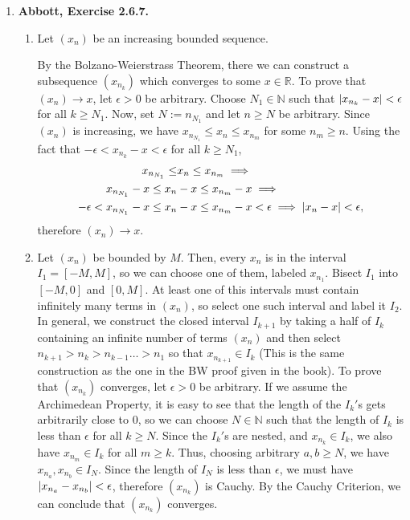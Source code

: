 \documentclass{article}
\DeclarePairedDelimiter\abs{\lvert}{\rvert}
\newcommand{\N}{\mathbb{N}}
\newcommand{\R}{\mathbb{R}}
\newcommand{\ra}{\rightarrow}
\newcommand{\exc}[2][Abbott]{\item \textbf{#1, Exercise #2.}}
\newcommand{\lep}[1][L]{#1et $\epsilon > 0$ be arbitrary}
\begin{document}
\begin{enumerate}
\begin{enumerate}
        \item 
    \end{enumerate}
    
    \exc{2.6.7}
    \begin{enumerate}
        \item Let $(x_n)$ be an increasing bounded sequence. 
        
        By the Bolzano-Weierstrass Theorem, there we can construct a subsequence $(x_{n_k})$ which converges to some $x \in \R$. To prove that $(x_n) \ra x$, \lep[l]. Choose $N_1 \in \N$ such that $\abs{x_{n_k}-x} < \epsilon$ for all $k \geq N_1$. Now, set $N := n_{N_1}$ and let $n \geq N$ be arbitrary. Since $(x_n)$ is increasing, we have $x_{n_{N_1}} \leq x_n \leq x_{n_m}$ for some $n_m \geq n$. Using the fact that $-\epsilon< x_{n_k} -x < \epsilon$ for all $k \geq N_1$, 
        \begin{align*}
            x_{n_{N_1}} \leq &x_n \leq x_{n_m} \implies \\
            x_{n_{N_1}}-x \leq x_n&-x \leq x_{n_m}-x \implies \\
            -\epsilon < x_{n_{N_1}}-x \leq x_n&-x \leq x_{n_m}-x < \epsilon \implies
            \abs{x_n-x} < \epsilon,
        \end{align*} therefore $(x_n) \ra x$.
        
        \item Let $(x_n)$ be bounded by $M$. Then, every $x_n$ is in the interval $I_1 = [-M,M]$, so we can choose one of them, labeled $x_{n_1}$. Bisect $I_1$ into $[-M, 0]$ and $[0, M]$. At least one of this intervals must contain infinitely many terms in $(x_n)$, so select one such interval and label it $I_2$. In general, we construct the closed interval $I_{k+1}$ by taking a half of $I_k$ containing an infinite number of terms $(x_n)$ and then select $n_{k+1} > n_k > n_{k-1} \dots > n_1$ so that $x_{n_{k+1}} \in I_k$ (This is the same construction as the one in the BW proof given in the book). To prove that $(x_{n_k})$ converges, \lep[l]. If we assume the Archimedean Property, it is easy to see that the length of the $I_k'$s gets arbitrarily close to $0$, so we can choose $N \in \N$ such that the length of $I_k$ is less than $\epsilon$ for all $k \geq N$. Since the $I_k'$s are nested, and $x_{n_k} \in I_k$, we also have $x_{n_m} \in I_k$ for all $m \geq k$. Thus, choosing arbitrary $a,b \geq N$, we have $x_{n_a},x_{n_b} \in I_N$. Since the length of $I_N$ is less than $\epsilon$, we must have $\abs{x_{n_a}-x_{n_b}} < \epsilon$, therefore $(x_{n_k})$ is Cauchy. By the Cauchy Criterion, we can conclude that $(x_{n_k})$ converges.
        

\end{enumerate}
\end{enumerate}
\end{document}
